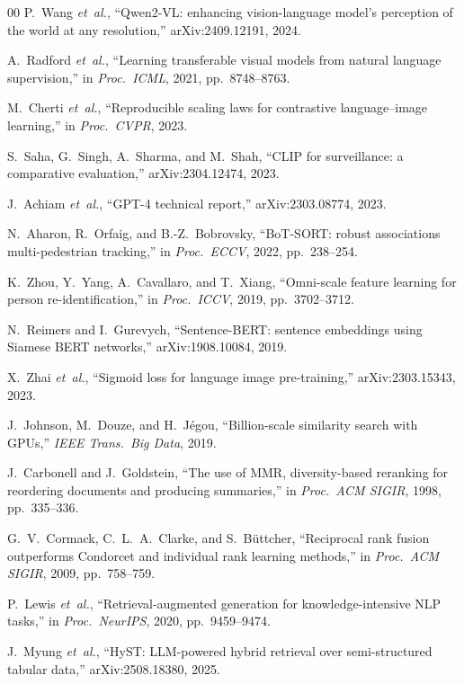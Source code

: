 ﻿\documentclass[conference]{IEEEtran}
\theoremstyle{definition}
\begin{document}
\begin{thebibliography}{00}
 P.~Wang \emph{et~al.}, ``Qwen2-VL: enhancing vision-language model's perception of the world at any resolution,'' arXiv:2409.12191, 2024.

 A.~Radford \emph{et~al.}, ``Learning transferable visual models from natural language supervision,'' in \emph{Proc.\ ICML}, 2021, pp.~8748--8763.

 M.~Cherti \emph{et~al.}, ``Reproducible scaling laws for contrastive language--image learning,'' in \emph{Proc.\ CVPR}, 2023.

 S.~Saha, G.~Singh, A.~Sharma, and M.~Shah, ``CLIP for surveillance: a comparative evaluation,'' arXiv:2304.12474, 2023.

 J.~Achiam \emph{et~al.}, ``GPT-4 technical report,'' arXiv:2303.08774, 2023.

 N.~Aharon, R.~Orfaig, and B.-Z.~Bobrovsky, ``BoT-SORT: robust associations multi-pedestrian tracking,'' in \emph{Proc.\ ECCV}, 2022, pp.~238--254.

 K.~Zhou, Y.~Yang, A.~Cavallaro, and T.~Xiang, ``Omni-scale feature learning for person re-identification,'' in \emph{Proc.\ ICCV}, 2019, pp.~3702--3712.

 N.~Reimers and I.~Gurevych, ``Sentence-BERT: sentence embeddings using Siamese BERT networks,'' arXiv:1908.10084, 2019.

 X.~Zhai \emph{et~al.}, ``Sigmoid loss for language image pre-training,'' arXiv:2303.15343, 2023.

 J.~Johnson, M.~Douze, and H.~J\'egou, ``Billion-scale similarity search with GPUs,'' \emph{IEEE Trans.\ Big Data}, 2019.

 J.~Carbonell and J.~Goldstein, ``The use of MMR, diversity-based reranking for reordering documents and producing summaries,'' in \emph{Proc.\ ACM SIGIR}, 1998, pp.~335--336.

 G.~V.~Cormack, C.~L.~A.~Clarke, and S.~B\"uttcher, ``Reciprocal rank fusion outperforms Condorcet and individual rank learning methods,'' in \emph{Proc.\ ACM SIGIR}, 2009, pp.~758--759.

 P.~Lewis \emph{et~al.}, ``Retrieval-augmented generation for knowledge-intensive NLP tasks,'' in \emph{Proc.\ NeurIPS}, 2020, pp.~9459--9474.

 J.~Myung \emph{et~al.}, ``HyST: LLM-powered hybrid retrieval over semi-structured tabular data,'' arXiv:2508.18380, 2025.


\end{thebibliography}
\end{document}
